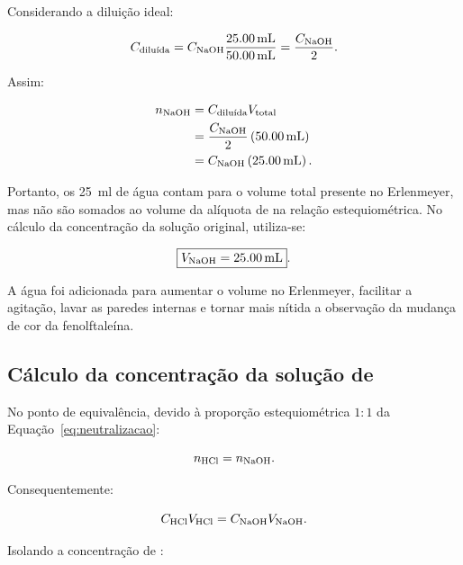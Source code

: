 \documentclass[a4paper,12pt]{article}
\begin{document}
Considerando a diluição ideal:

\begin{equation}
  C_{\text{diluída}}
  =
  C_{\ce{NaOH}}
  \frac{\qty{25.00}{\milli\litre}}
       {\qty{50.00}{\milli\litre}}
  =
  \frac{C_{\ce{NaOH}}}{2}.
  \label{eq:concentracao_diluida}
\end{equation}

Assim:

\begin{align}
  n_{\ce{NaOH}}
    &=C_{\text{diluída}}V_{\text{total}} \nonumber\\
    &=\frac{C_{\ce{NaOH}}}{2}
      \left(\qty{50.00}{\milli\litre}\right) \nonumber\\
    &=C_{\ce{NaOH}}
      \left(\qty{25.00}{\milli\litre}\right).
  \label{eq:demonstracao_diluicao}
\end{align}

Portanto, os \qty{25}{\milli\litre} de água contam para o volume total
presente no Erlenmeyer, mas não são somados ao volume da alíquota de
 na relação estequiométrica. No cálculo da concentração da
solução original, utiliza-se:

\begin{equation}
  \boxed{V_{\ce{NaOH}}=\qty{25.00}{\milli\litre}}.
  \label{eq:volume_correto}
\end{equation}

A água foi adicionada para aumentar o volume no Erlenmeyer, facilitar a
agitação, lavar as paredes internas e tornar mais nítida a observação da
mudança de cor da fenolftaleína.

\subsection{Cálculo da concentração da solução de }

No ponto de equivalência, devido à proporção estequiométrica $1:1$ da
Equação~\ref{eq:neutralizacao}:

\begin{equation}
  n_{\ce{HCl}}=n_{\ce{NaOH}}.
\end{equation}

Consequentemente:

\begin{equation}
  C_{\ce{HCl}}V_{\ce{HCl}}
  =
  C_{\ce{NaOH}}V_{\ce{NaOH}}.
  \label{eq:relacao_titulacao}
\end{equation}

Isolando a concentração de :
\end{document}
